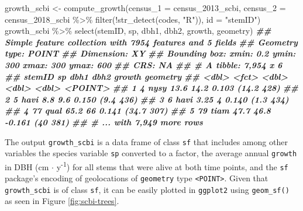 \documentclass[12pt]{article}
\newenvironment{Shaded}{\begin{snugshade}}{\end{snugshade}}
\newcommand{\AttributeTok}[1]{\textcolor[rgb]{0.77,0.63,0.00}{#1}}
\newcommand{\DocumentationTok}[1]{\textcolor[rgb]{0.56,0.35,0.01}{\textbf{\textit{#1}}}}
\newcommand{\FunctionTok}[1]{\textcolor[rgb]{0.00,0.00,0.00}{#1}}
\newcommand{\NormalTok}[1]{#1}
\newcommand{\OtherTok}[1]{\textcolor[rgb]{0.56,0.35,0.01}{#1}}
\newcommand{\SpecialCharTok}[1]{\textcolor[rgb]{0.00,0.00,0.00}{#1}}
\newcommand{\StringTok}[1]{\textcolor[rgb]{0.31,0.60,0.02}{#1}}
\begin{document}
\begin{Shaded}
\begin{Highlighting}[]
\NormalTok{growth\_scbi }\OtherTok{\textless{}{-}} \FunctionTok{compute\_growth}\NormalTok{(}\AttributeTok{census\_1 =}\NormalTok{ census\_2013\_scbi, }\AttributeTok{census\_2 =}\NormalTok{ census\_2018\_scbi }\SpecialCharTok{\%\textgreater{}\%}
    \FunctionTok{filter}\NormalTok{(}\SpecialCharTok{!}\FunctionTok{str\_detect}\NormalTok{(codes, }\StringTok{"R"}\NormalTok{)), }\AttributeTok{id =} \StringTok{"stemID"}\NormalTok{)}
\NormalTok{growth\_scbi }\SpecialCharTok{\%\textgreater{}\%}
    \FunctionTok{select}\NormalTok{(stemID, sp, dbh1, dbh2, growth, geometry)}
\DocumentationTok{\#\# Simple feature collection with 7954 features and 5 fields}
\DocumentationTok{\#\# Geometry type: POINT}
\DocumentationTok{\#\# Dimension:     XY}
\DocumentationTok{\#\# Bounding box:  xmin: 0.2 ymin: 300 xmax: 300 ymax: 600}
\DocumentationTok{\#\# CRS:           NA}
\DocumentationTok{\#\# \# A tibble: 7,954 x 6}
\DocumentationTok{\#\#   stemID sp     dbh1  dbh2 growth   geometry}
\DocumentationTok{\#\#    \textless{}dbl\textgreater{} \textless{}fct\textgreater{} \textless{}dbl\textgreater{} \textless{}dbl\textgreater{}  \textless{}dbl\textgreater{}    \textless{}POINT\textgreater{}}
\DocumentationTok{\#\# 1      4 nysy  13.6   14.2  0.103 (14.2 428)}
\DocumentationTok{\#\# 2      5 havi   8.8    9.6  0.150  (9.4 436)}
\DocumentationTok{\#\# 3      6 havi   3.25   4    0.140  (1.3 434)}
\DocumentationTok{\#\# 4     77 qual  65.2   66    0.141 (34.7 307)}
\DocumentationTok{\#\# 5     79 tiam  47.7   46.8 {-}0.161   (40 381)}
\DocumentationTok{\#\# \# ... with 7,949 more rows}
\end{Highlighting}
\end{Shaded}

The output \texttt{growth\_scbi} is a data frame of class \texttt{sf}
that includes among other variables the species variable \texttt{sp}
converted to a factor, the average annual \texttt{growth} in DBH (cm
\(\cdot\) y\textsuperscript{-1}) for all stems that were alive at both
time points, and the \texttt{sf} package's encoding of geolocations of
\texttt{geometry} type \texttt{\textless{}POINT\textgreater{}}. Given
that \texttt{growth\_scbi} is of class \texttt{sf}, it can be easily
plotted in \texttt{ggplot2} using \texttt{geom\_sf()} as seen in Figure
\ref{fig:scbi-trees}.
\end{document}
